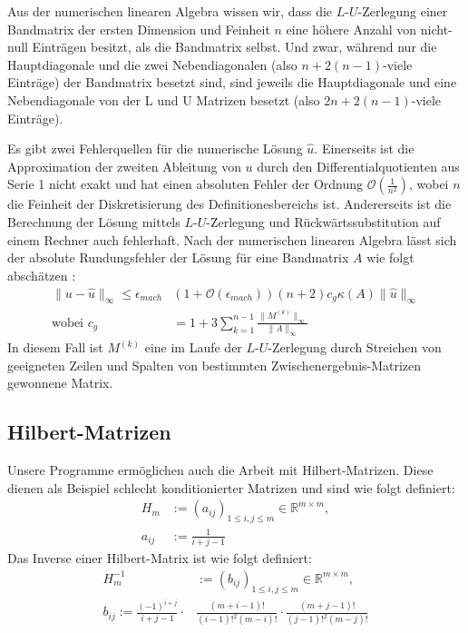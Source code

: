 \documentclass[smallheadings]{scrartcl}
\numberwithin{equation}{section}
\begin{document}
Aus der numerischen linearen Algebra wissen wir, dass die $L$-$U$-Zerlegung einer Bandmatrix der ersten Dimension und Feinheit $n$ eine höhere Anzahl von nicht-null Einträgen besitzt, als die Bandmatrix selbst. Und zwar, während nur die Hauptdiagonale und die zwei Nebendiagonalen (also $n+2(n-1)$-viele Einträge) der Bandmatrix besetzt sind, sind jeweils die Hauptdiagonale und eine Nebendiagonale von der L und U Matrizen besetzt (also $2n+2(n-1)$-viele Einträge).

Es gibt zwei Fehlerquellen für die numerische Lösung $\hat{u}$. Einerseits ist die Approximation der zweiten Ableitung von $u$ durch den Differentialquotienten aus Serie 1 nicht exakt und hat einen absoluten Fehler der Ordnung $\mathcal{O}(\frac{1}{n^2})$, wobei $n$ die Feinheit der Diskretisierung des Definitionesbereichs ist. Andererseits ist die Berechnung der Lösung mittels $L$-$U$-Zerlegung und Rückwärtssubstitution auf einem Rechner auch fehlerhaft. Nach der numerischen linearen Algebra lässt sich der absolute Rundungsfehler der Lösung für eine Bandmatrix $A$ wie folgt abschätzen \cite{nla}:
\begin{align}
\|u-\hat{u}\|_{\infty}\le \epsilon_{mach}&(1+\mathcal{O}(\epsilon_{mach}))(n+2)c_g\kappa(A)\|\hat{u}\|_{\infty} \\
\text{wobei } c_g&=1+3\sum_{k=1}^{n-1}\frac{\|M^{(k)}\|_{\infty}}{\|A\|_{\infty}}
\label{eq:rundfeh}
\end{align}
In diesem Fall ist $M^{(k)}$ eine im Laufe der $L$-$U$-Zerlegung durch Streichen von geeigneten Zeilen und Spalten von bestimmten Zwischenergebnis-Matrizen gewonnene Matrix.

\subsection{Hilbert-Matrizen}
Unsere Programme ermöglichen auch die Arbeit mit Hilbert-Matrizen. Diese dienen als Beispiel schlecht konditionierter Matrizen und sind wie folgt definiert:
\begin{align}
	H_m &:= (a_{ij})_{1\le i, j \le m} \in \mathbb{R}^{m\times m}, 	\\
	a_{ij} &:= \frac{1}{i+j-1} \label{eq:hb1}
\end{align}
Das Inverse einer Hilbert-Matrix ist wie folgt definiert:
\begin{align}
	H_m^{-1}& := (b_{ij})_{1\le i, j \le m} \in \mathbb{R}^{m\times m},	\\
	b_{ij} := \frac{(-1)^{i+j}}{i+j-1}\cdot &\frac{(m+i-1)!}{(i-1)!^2(m-i)!}\cdot \frac{(m+j-1)!}{(j-1)!^2(m-j)!}
\end{align}
\end{document}
